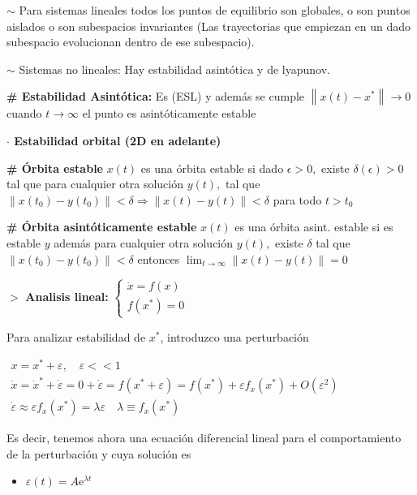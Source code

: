 \documentclass[%
 reprint,
 amsmath,amssymb,
 aps,
]{revtex4-1}
\begin{document}
$\sim$ Para sistemas lineales todos los puntos de equilibrio son globales, o son puntos aislados o son subespacios invariantes (Las trayectorias que empiezan en un dado subespacio evolucionan dentro de ese subespacio).

$\sim$ Sistemas no lineales: Hay estabilidad asintótica y de lyapunov.


\textbf{\# Estabilidad Asintótica:} Es (ESL) y además se cumple $\left\|x(t)-x^{*}\right\| \rightarrow 0$ cuando $t \rightarrow \infty$ el punto es asintóticamente estable

\textbf{$\cdot$ Estabilidad orbital (2D en adelante)}

\textbf{\# Órbita estable} $x(t)$ es una órbita estable si dado $\epsilon>0,$ existe $\delta(\epsilon)>0$ tal que para cualquier otra solución $y(t),$ tal que $\| x\left(t_{0}\right)-y\left(t_{0}\right) \|<\delta \Rightarrow \| x(t)-y(t) \| < \delta$ para todo $t>t_{0}$

\textbf{\# Órbita asintóticamente estable} $x(t)$ es una órbita asint. estable si es estable $y$ además para cualquier otra solución $y(t),$ existe $\delta$ tal que $\| x\left(t_{0}\right)-y\left(t_{0}\right) \|<\delta$ entonces $\lim _{t \rightarrow \infty} \| x\left(t\right)-y\left(t\right) \| =0$


$>$ \textbf{Analisis lineal:}
$
\left\lbrace 
\begin{array}{l}
\dot{x}=f(x) \\
f\left(x^{*}\right)=0
\end{array}
\right.
$

Para analizar estabilidad de $x^{*}$, introduzco una perturbación

$
\begin{array}{c}
x = x^{*}+\varepsilon, \quad \varepsilon<<1 \\
\dot{x}=\dot{x}^{*}+\dot{\varepsilon}=0+\dot{\varepsilon}=f\left(x^{*}+\varepsilon\right)=f\left(x^{*}\right)+\varepsilon f_{x}\left(x^{*}\right)+O\left(\varepsilon^{2}\right) \\
\dot{\varepsilon} \approx \varepsilon f_{x}\left(x^{*}\right)=\lambda \varepsilon \quad \lambda \equiv f_{x}\left(x^{*}\right)
\end{array}
$

Es decir, tenemos ahora una ecuación diferencial lineal para el comportamiento de la perturbación y cuya solución es

\begin{itemize}\centering
  \item[]  $\varepsilon(t)=A \mathrm{e}^{\lambda t}$
\end{itemize}
\end{document}
